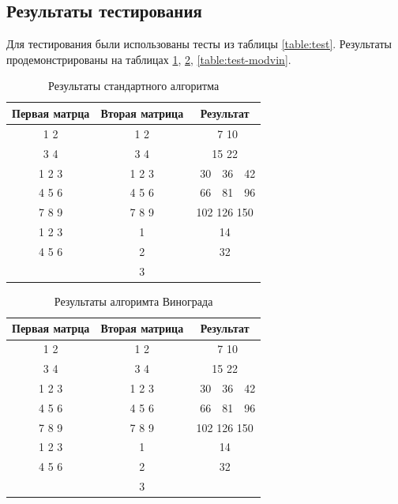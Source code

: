 \documentclass[a4paper,12pt]{article}
\begin{document}
\subsection{Результаты тестирования}

Для тестирования были использованы тесты из таблицы \ref{table:test}.
Результаты продемонстрированы на таблицах \ref{table:test-default},
\ref{table:test-vin}, \ref{table:test-modvin}.

\begin{table}[H]
    \caption{Результаты стандартного алгоритма}
    \label{table:test-default}
    \centering
    \begin{tabular}{|c|c|c|}
        \hline
        Первая матрца & Вторая матрица & Результат \\
        \hline
        1 2 & 1 2 & \ 7 10 \\
        3 4 & 3 4 & 15 22 \\
        \hline
        1 2 3 & 1 2 3 & \ 30\ \ 36\ \ 42 \\
        4 5 6 & 4 5 6 & \ 66\ \ 81\ \ 96 \\
        7 8 9 & 7 8 9 & 102 126 150 \\
        \hline
        1 2 3 & 1 & 14 \\
        4 5 6 & 2 & 32 \\
              & 3 & \\
        \hline
    \end{tabular}
\end{table}

\begin{table}[H]
    \caption{Результаты алгоримта Винограда}
    \label{table:test-vin}
    \centering
    \begin{tabular}{|c|c|c|}
        \hline
        Первая матрца & Вторая матрица & Результат \\
        \hline
        1 2 & 1 2 & \ 7 10 \\
        3 4 & 3 4 & 15 22 \\
        \hline
        1 2 3 & 1 2 3 & \ 30\ \ 36\ \ 42 \\
        4 5 6 & 4 5 6 & \ 66\ \ 81\ \ 96 \\
        7 8 9 & 7 8 9 & 102 126 150 \\
        \hline
        1 2 3 & 1 & 14 \\
        4 5 6 & 2 & 32 \\
              & 3 & \\
        \hline
    \end{tabular}
\end{table}
\end{document}
